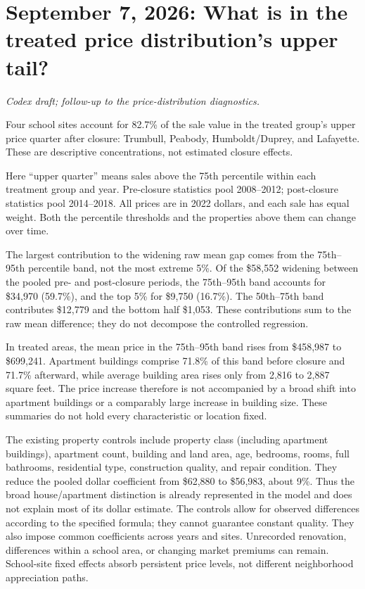 \section*{September 7, 2026: What is in the treated price distribution's upper tail?}
\textit{Codex draft; follow-up to the price-distribution diagnostics.}

Four school sites account for 82.7\% of the sale value in the treated group's
upper price quarter after closure: Trumbull, Peabody, Humboldt/Duprey, and
Lafayette. These are descriptive concentrations, not estimated closure effects.

Here ``upper quarter'' means sales above the 75th percentile within each
treatment group and year. Pre-closure statistics pool 2008--2012; post-closure
statistics pool 2014--2018. All prices are in 2022
dollars, and each sale has equal weight. Both the percentile thresholds and
the properties above them can change over time.

\begin{center}
{\small}
\end{center}

The largest contribution to the widening raw mean gap comes from the
75th--95th percentile band, not the most extreme 5\%. Of the \$58,552 widening
between the pooled pre- and post-closure periods, the 75th--95th band accounts
for \$34,970 (59.7\%), and the top 5\% for \$9,750 (16.7\%). The 50th--75th
band contributes \$12,779 and the bottom half \$1,053. These contributions
sum to the raw mean difference; they do not decompose the controlled regression.

In treated areas, the mean price in the 75th--95th band rises from \$458,987
to \$699,241. Apartment buildings comprise 71.8\% of this band before closure
and 71.7\% afterward, while average building area rises only from 2,816 to
2,887 square feet. The price increase therefore is not accompanied by a broad
shift into apartment buildings or a comparably large increase in building size.
These summaries do not hold every characteristic or location fixed.

The existing property controls include property class (including apartment
buildings), apartment count, building and land area, age, bedrooms, rooms,
full bathrooms, residential type, construction quality, and repair condition.
They reduce the pooled dollar coefficient from \$62,880 to \$56,983, about
9\%. Thus the broad house/apartment distinction is already represented in
the model and does not explain most of its dollar estimate. The controls allow
for observed differences according to the specified formula; they cannot
guarantee constant quality. They also impose common coefficients across years
and sites. Unrecorded renovation, differences within a school area, or changing
market premiums can remain. School-site fixed effects absorb persistent price
levels, not different neighborhood appreciation paths.

